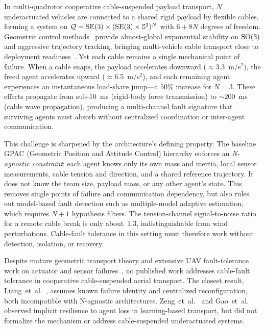 
In multi-quadrotor cooperative cable-suspended payload transport, $N$ underactuated vehicles are connected to a shared rigid payload by flexible cables, forming a system on $\mathcal{Q} = \mathrm{SE}(3) \times (\mathrm{SE}(3) \times \mathbb{S}^2)^N$ with $6 + 8N$ degrees of freedom. Geometric control methods~\cite{lee2010geometric,sreenath2013geometric,lee2018geometric,wu2014geometric} provide almost-global exponential stability on $\mathrm{SO}(3)$ and aggressive trajectory tracking, bringing multi-vehicle cable transport close to deployment readiness~\cite{estevez2024review,sun2025agile}. Yet each cable remains a single mechanical point of failure. When a cable snaps, the payload accelerates downward (${\approx}3.3$~m/s$^2$), the freed agent accelerates upward (${\approx}6.5$~m/s$^2$), and each remaining agent experiences an instantaneous load-share jump---a $50\%$ increase for $N{=}3$. These effects propagate from sub-$10$~ms (rigid-body force transmission) to ${\sim}200$~ms (cable wave propagation), producing a multi-channel fault signature that surviving agents must absorb without centralized coordination or inter-agent communication.

This challenge is sharpened by the architecture's defining property. The baseline GPAC (Geometric Position and Attitude Control) hierarchy enforces an \emph{N-agnostic constraint}: each agent knows only its own mass and inertia, local sensor measurements, cable tension and direction, and a shared reference trajectory. It does not know the team size, payload mass, or any other agent's state. This removes single points of failure and communication dependency, but also rules out model-based fault detection such as multiple-model adaptive estimation, which requires $N{+}1$ hypothesis filters. The tension-channel signal-to-noise ratio for a remote cable break is only about~$1.3$, indistinguishable from wind perturbations. Cable-fault tolerance in this setting must therefore work without detection, isolation, or recovery.


Despite mature geometric transport theory and extensive UAV fault-tolerance work on actuator and sensor failures~\cite{sun2020incremental,zhang2024fault,adaika2025fdd}, no published work addresses cable-fault tolerance in cooperative cable-suspended aerial transport. The closest result, Liang~et~al.~\cite{liang2021fault}, assumes known failure identity and centralized reconfiguration, both incompatible with N-agnostic architectures. Zeng~et~al.~\cite{zeng2025decentralized} and Gao~et~al.~\cite{gao2024decentralized} observed implicit resilience to agent loss in learning-based transport, but did not formalize the mechanism or address cable-suspended underactuated systems.

